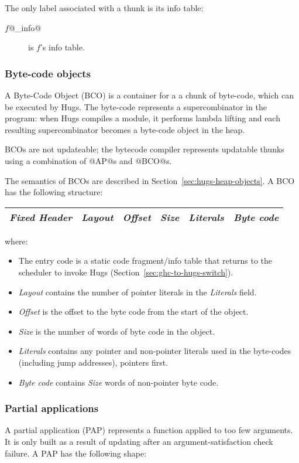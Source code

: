 \documentclass[11pt]{article}
\newcommand{\secref}[1]{Section~\ref{sec:#1}}
\newcommand{\Subsubsection}[2]{\subsubsection{#1}\label{sec:#2}}
\begin{document}
The only label associated with a thunk is its info table:

\begin{description}
\item[$f$@\_info@] is $f$'s info table.
\end{description}


\Subsubsection{Byte-code objects}{BCO}

A Byte-Code Object (BCO) is a container for a a chunk of byte-code,
which can be executed by Hugs.  The byte-code represents a
supercombinator in the program: when Hugs compiles a module, it
performs lambda lifting and each resulting supercombinator becomes a
byte-code object in the heap.

BCOs are not updateable; the bytecode compiler represents updatable
thunks using a combination of @AP@s and @BCO@s.

The semantics of BCOs are described in \secref{hugs-heap-objects}.  A
BCO has the following structure:

\begin{center}
\begin{tabular}{|l|l|l|l|l|l|}
\hline 
\emph{Fixed Header} & \emph{Layout} & \emph{Offset} & \emph{Size} &
\emph{Literals} & \emph{Byte code} \\
\hline
\end{tabular}
\end{center}

\noindent where:
\begin{itemize}
\item The entry code is a static code fragment/info table that returns
to the scheduler to invoke Hugs (\secref{ghc-to-hugs-switch}).
\item \emph{Layout} contains the number of pointer literals in the
\emph{Literals} field.
\item \emph{Offset} is the offset to the byte code from the start of
the object.
\item \emph{Size} is the number of words of byte code in the object.
\item \emph{Literals} contains any pointer and non-pointer literals used in
the byte-codes (including jump addresses), pointers first.
\item \emph{Byte code} contains \emph{Size} words of non-pointer byte
code.
\end{itemize}


\Subsubsection{Partial applications}{PAP}

A partial application (PAP) represents a function applied to too few
arguments.  It is only built as a result of updating after an
argument-satisfaction check failure.  A PAP has the following shape:
\end{document}
